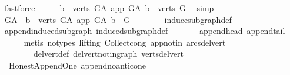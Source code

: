 \begin{isabellebody}
\ fastforce\isanewline
\ \ \isamarkupfalse%
\ \isamarkupfalse%
\ {\isachardoublequoteopen}{\isacharbraceleft}{\kern0pt}b\ {\isasymin}\ verts\ G{\isacharunderscore}{\kern0pt}A{\isachardot}{\kern0pt}\ app\ {\isasymrightarrow}\isactrlsup {\isacharplus}{\kern0pt}\isactrlbsub G{\isacharunderscore}{\kern0pt}A\isactrlesub \ b{\isacharbraceright}{\kern0pt}\ {\isacharequal}{\kern0pt}\ verts\ G{\isachardoublequoteclose}\ \isamarkupfalse%
\ simp\ \isanewline
\ \ \isamarkupfalse%
\ \isamarkupfalse%
\ {\isachardoublequoteopen}G{\isacharunderscore}{\kern0pt}A\ {\isasymrestriction}\ {\isacharbraceleft}{\kern0pt}b\ {\isasymin}\ verts\ G{\isacharunderscore}{\kern0pt}A{\isachardot}{\kern0pt}\ app\ {\isasymrightarrow}\isactrlsup {\isacharplus}{\kern0pt}\isactrlbsub G{\isacharunderscore}{\kern0pt}A\isactrlesub \ b{\isacharbraceright}{\kern0pt}\ {\isacharequal}{\kern0pt}\ G\ {\isachardoublequoteclose}\ \isanewline
\ \ \ \ \isamarkupfalse%
\ induce{\isacharunderscore}{\kern0pt}subgraph{\isacharunderscore}{\kern0pt}def\ \isanewline
\ \ \ \ \isamarkupfalse%
\ append{\isacharunderscore}{\kern0pt}induced{\isacharunderscore}{\kern0pt}subgraph\ induced{\isacharunderscore}{\kern0pt}subgraph{\isacharunderscore}{\kern0pt}def\ \isanewline
\ \ \ \ \ \ append{\isacharunderscore}{\kern0pt}head\ append{\isacharunderscore}{\kern0pt}tail\isanewline
\ \ \ \ \isamarkupfalse%
\ {\isacharparenleft}{\kern0pt}metis\ {\isacharparenleft}{\kern0pt}no{\isacharunderscore}{\kern0pt}types{\isacharcomma}{\kern0pt}\ lifting{\isacharparenright}{\kern0pt}\ Collect{\isacharunderscore}{\kern0pt}cong\ app{\isacharunderscore}{\kern0pt}notin\ arcs{\isacharunderscore}{\kern0pt}del{\isacharunderscore}{\kern0pt}vert\isanewline
\ \ \ \ \ \ \ \ del{\isacharunderscore}{\kern0pt}vert{\isacharunderscore}{\kern0pt}def\ del{\isacharunderscore}{\kern0pt}vert{\isacharunderscore}{\kern0pt}not{\isacharunderscore}{\kern0pt}in{\isacharunderscore}{\kern0pt}graph\ verts{\isacharunderscore}{\kern0pt}del{\isacharunderscore}{\kern0pt}vert{\isacharparenright}{\kern0pt}\ \isanewline
{}\isamarkupfalse%
%
\endisatagproof
{\isafoldproof}%
%
\isadelimproof
\isanewline
%
\endisadelimproof
\isanewline
{}\isamarkupfalse%
\ {\isacharparenleft}{\kern0pt}\ Honest{\isacharunderscore}{\kern0pt}Append{\isacharunderscore}{\kern0pt}One{\isacharparenright}{\kern0pt}\ append{\isacharunderscore}{\kern0pt}no{\isacharunderscore}{\kern0pt}anticone{\isacharcolon}{\kern0pt}\isanewline

\end{isabellebody}
